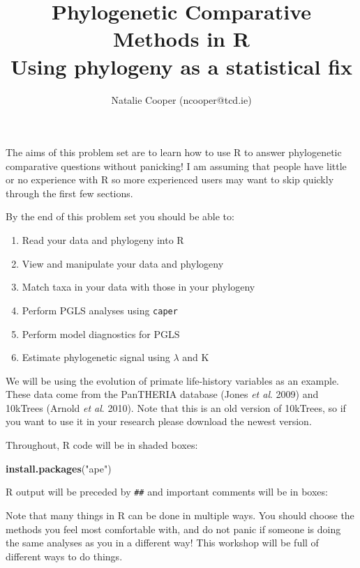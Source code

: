 \documentclass[12pt]{article}
\newcommand{\KeywordTok}[1]{\textcolor[rgb]{0.13,0.29,0.53}{\textbf{{#1}}}}
\newcommand{\StringTok}[1]{\textcolor[rgb]{0.31,0.60,0.02}{{#1}}}
\newcommand{\NormalTok}[1]{{#1}}
\begin{document}
\title{Phylogenetic Comparative Methods in R\\
Using phylogeny as a statistical fix}
\author{Natalie Cooper (ncooper@tcd.ie)}
\date{}
\maketitle

The aims of this problem set are to learn how to use R to answer phylogenetic 
comparative questions without panicking! I am assuming that people have little or no
experience with R so more experienced users may want to skip quickly through the first 
few sections. 

By the end of this problem set you should be able to:

\begin{enumerate}
\item Read your data and phylogeny into R
\item View and manipulate your data and phylogeny
\item Match taxa in your data with those in your phylogeny
\item Perform PGLS analyses using \texttt{caper}
\item Perform model diagnostics for PGLS
\item Estimate phylogenetic signal using $\lambda$ and K
\end{enumerate}

We will be using the evolution of primate life-history variables as an
example. These data come from the PanTHERIA database (Jones \textit{et
al}. 2009) and 10kTrees (Arnold \textit{et al}. 2010). Note that this is
an old version of 10kTrees, so if you want to use it in your research
please download the newest version.

Throughout, R code will be in shaded boxes:

\begin{snugshade}
\begin{Highlighting}[]
\KeywordTok{install.packages}\NormalTok{(}\StringTok{"ape"}\NormalTok{)}
\end{Highlighting}
\end{snugshade}

R output will be preceded by \texttt{\#\#} and important comments will be in boxes:

\begin{framed}
Note that many things in R can be done in multiple ways. You should
choose the methods you feel most comfortable with, and do not panic if
someone is doing the same analyses as you in a different way! This
workshop will be full of different ways to do things.
\end{framed}
\end{document}
